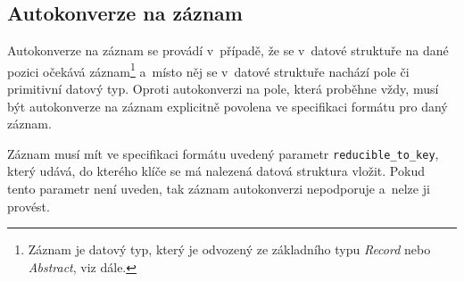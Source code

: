 \documentclass[FM,bw,DP]{tulthesis}
\begin{document}
\subsection{Autokonverze na záznam}
\label{sec:analyza-autokonverze-zaznam}

Autokonverze na záznam se provádí v~případě, že se v~datové struktuře na dané pozici očekává záznam\footnote{Záznam je datový typ, který je odvozený ze základního typu \textit{Record} nebo \textit{Abstract}, viz dále.} a~místo něj se v~datové struktuře nachází pole či primitivní datový typ. Oproti autokonverzi na pole, která proběhne vždy, musí být autokonverze na záznam explicitně povolena ve specifikaci formátu pro daný záznam.

Záznam musí mít ve specifikaci formátu uvedený parametr \texttt{reducible\_to\_key}, který udává, do kterého klíče se má nalezená datová struktura vložit. Pokud tento parametr není uveden, tak záznam autokonverzi nepodporuje a~nelze ji provést.
\end{document}

